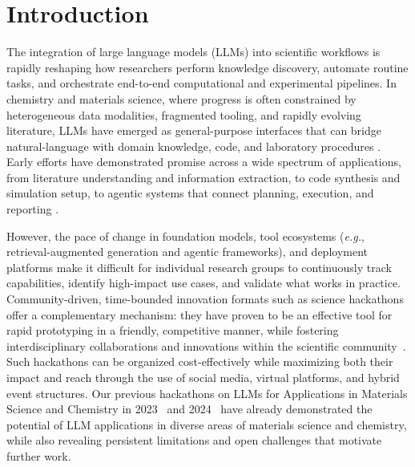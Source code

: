 \documentclass{article}
\begin{document}
\section*{Introduction}
The integration of large language models (LLMs) into scientific workflows is rapidly reshaping how researchers perform knowledge discovery, automate routine tasks, and orchestrate end-to-end computational and experimental pipelines.
In chemistry and materials science, where progress is often constrained by heterogeneous data modalities, fragmented tooling, and rapidly evolving literature, LLMs have emerged as general-purpose interfaces that can bridge natural-language with domain knowledge, code, and laboratory procedures \cite{miret2025enabling,ruan2024automatic,choudhary2023chemnlp,prein2025language}.
Early efforts have demonstrated promise across a wide spectrum of applications, from literature understanding and information extraction,
to code synthesis and simulation setup, to agentic systems that connect planning, execution, and reporting \cite{zheng2025large,lee2023towards}.

However, the pace of change in foundation models, tool ecosystems (\textit{e.g.}, retrieval-augmented generation and agentic frameworks), and deployment platforms make it difficult for individual research groups to continuously track capabilities, identify high-impact use cases, and validate what works in practice.
Community-driven, time-bounded innovation formats such as science hackathons offer a complementary mechanism: they have proven to be an effective tool for rapid prototyping in a friendly, competitive manner, while fostering interdisciplinary collaborations and innovations within the scientific community~\cite{pe2019understanding, nolte2020support, heller2023hack}.
Such hackathons can be organized cost-effectively while maximizing both their impact and reach through the use of social media, virtual platforms, and hybrid event structures.
Our previous hackathons on LLMs for Applications in Materials Science and Chemistry in 2023~\cite{jablonka202314} and 2024~\cite{llm2024} have already demonstrated the potential of LLM applications in diverse areas of materials science and chemistry, while also revealing persistent limitations and open challenges that motivate further work.
\end{document}
